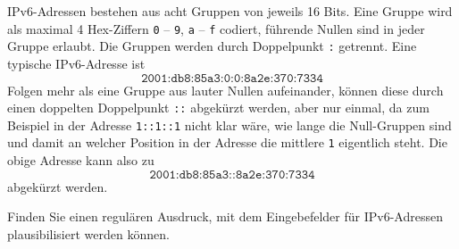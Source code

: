 IPv6-Adressen bestehen aus acht Gruppen von jeweils 16 Bits.
Eine Gruppe wird als maximal 4 Hex-Ziffern \texttt{0} -- \texttt{9},
\texttt{a} -- \texttt{f} codiert, führende Nullen sind in jeder Gruppe erlaubt.
Die Gruppen werden durch Doppelpunkt \texttt{:} getrennt.
Eine typische IPv6-Adresse ist
\[
\texttt{2001:db8:85a3:0:0:8a2e:370:7334}
\]
Folgen mehr als eine Gruppe aus lauter Nullen aufeinander, können diese 
durch einen doppelten Doppelpunkt \texttt{::} abgekürzt werden, aber
nur einmal, da zum Beispiel in der Adresse \texttt{1::1::1} nicht klar wäre,
wie lange die Null-Gruppen
sind und damit an welcher Position in der Adresse die mittlere \texttt{1}
eigentlich steht.
Die obige Adresse kann also zu
\[
\texttt{2001:db8:85a3::8a2e:370:7334}
\]
abgekürzt werden.

Finden Sie einen regulären Ausdruck, mit dem Eingebefelder für IPv6-Adressen
plausibilisiert werden können.

